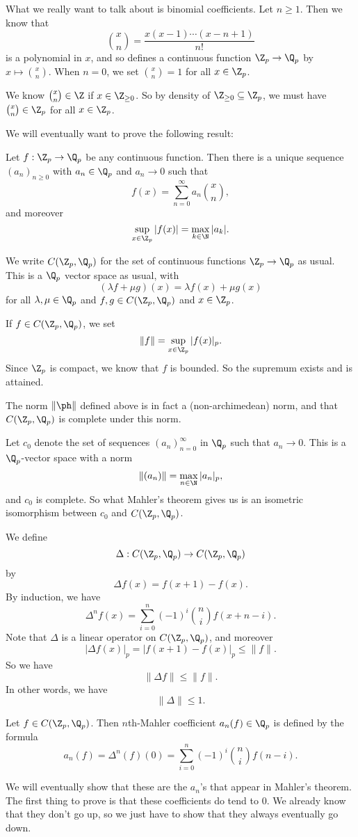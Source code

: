 \documentclass[a4paper]{article}
\begin{document}
What we really want to talk about is binomial coefficients. Let $n \geq 1$. Then we know that
\[
  \binom{x}{n} = \frac{x(x - 1) \cdots (x - n + 1)}{n!}
\]
is a polynomial in $x$, and so defines a continuous function $\Z_p \to \Q_p$ by $x \mapsto \binom{x}{n}$. When $n = 0$, we set $\binom{x}{n} = 1$ for all $x \in \Z_p$.

We know $\binom{x}{n} \in \Z$ if $x \in \Z_{\geq 0}$. So by density of $\Z_{\geq 0} \subseteq \Z_p$, we must have $\binom{x}{n} \in \Z_p$ for all $x \in \Z_p$.

We will eventually want to prove the following result:
\begin{thm}
  Let $f: \Z_p \to \Q_p$ be any continuous function. Then there is a unique sequence $(a_n)_{n \geq 0}$ with $a_n \in \Q_p$ and $a_n \to 0$ such that
  \[
    f(x) = \sum_{n = 0}^\infty a_n \binom{x}{n},
  \]
  and moreover
  \[
    \sup_{x \in \Z_p}|f(x)| = \max_{k \in \N} |a_k|.
  \]
\end{thm}

We write $C(\Z_p, \Q_p)$ for the set of continuous functions $\Z_p \to \Q_p$ as usual. This is a $\Q_p$ vector space as usual, with
\[
  (\lambda f + \mu g)(x) = \lambda f(x) + \mu g(x)
\]
for all $\lambda, \mu \in \Q_p$ and $f, g \in C(\Z_p, \Q_p)$ and $x \in \Z_p$.

If $f \in C(\Z_p, \Q_p)$, we set
\[
  \|f\| = \sup_{x \in \Z_p} |f(x)|_p.
\]
Since $\Z_p$ is compact, we know that $f$ is bounded. So the supremum exists and is attained.

\begin{prop}
  The norm $\|\ph\|$ defined above is in fact a (non-archimedean) norm, and that $C(\Z_p, \Q_p)$ is complete under this norm.
\end{prop}

Let $c_0$ denote the set of sequences $(a_n)_{n = 0}^\infty$ in $\Q_p$ such that $a_n \to 0$. This is a $\Q_p$-vector space with a norm
\[
  \|(a_n)\| = \max_{n \in \N} |a_n|_p,
\]
and $c_0$ is complete. So what Mahler's theorem gives us is an isometric isomorphism between $c_0$ and $C(\Z_p, \Q_p)$.

We define
\[
  \Delta: C(\Z_p, \Q_p) \to C(\Z_p, \Q_p)
\]
by
\[
  \Delta f(x) = f(x + 1) - f(x).
\]
By induction, we have
\[
  \Delta^n f(x) = \sum_{i = 0}^n (-1)^i \binom{n}{i} f(x + n - i).
\]
Note that $\Delta$ is a linear operator on $C(\Z_p, \Q_p)$, and moreover
\[
  |\Delta f(x)|_p = |f(x + 1) - f(x)|_p \leq \|f\|.
\]
So we have
\[
  \|\Delta f\| \leq \|f\|.
\]
In other words, we have
\[
  \|\Delta\| \leq 1.
\]
\begin{defi}
  Let $f \in C(\Z_p, \Q_p)$. Then $n$th-Mahler coefficient $a_n(f) \in \Q_p$ is defined by the formula
  \[
    a_n(f) = \Delta^n(f)(0) = \sum_{i = 0}^n (-1)^i \binom{n}{i} f(n - i).
  \]
\end{defi}
We will eventually show that these are the $a_n$'s that appear in Mahler's theorem. The first thing to prove is that these coefficients do tend to $0$. We already know that they don't go up, so we just have to show that they always eventually go down.
\end{document}
